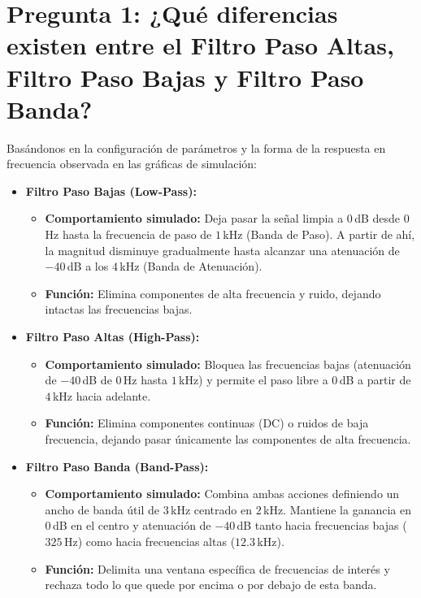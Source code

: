 \section{Pregunta 1: ¿Qué diferencias existen entre el Filtro Paso Altas, Filtro Paso Bajas y Filtro Paso Banda?}

Basándonos en la configuración de parámetros y la forma de la respuesta en frecuencia observada en las gráficas de simulación:

\begin{itemize}
	\item \textbf{Filtro Paso Bajas (Low-Pass):}
	\begin{itemize}
		\item \textbf{Comportamiento simulado:} Deja pasar la señal limpia a $0$\,dB desde $0$\,Hz hasta la frecuencia de paso de $1$\,kHz (Banda de Paso). A partir de ahí, la magnitud disminuye gradualmente hasta alcanzar una atenuación de $-40$\,dB a los $4$\,kHz (Banda de Atenuación).
		\item \textbf{Función:} Elimina componentes de alta frecuencia y ruido, dejando intactas las frecuencias bajas.
	\end{itemize}
	\item \textbf{Filtro Paso Altas (High-Pass):}
	\begin{itemize}
		\item \textbf{Comportamiento simulado:} Bloquea las frecuencias bajas (atenuación de $-40$\,dB de $0$\,Hz hasta $1$\,kHz) y permite el paso libre a $0$\,dB a partir de $4$\,kHz hacia adelante.
		\item \textbf{Función:} Elimina componentes continuas (DC) o ruidos de baja frecuencia, dejando pasar únicamente las componentes de alta frecuencia.
	\end{itemize}
	\item \textbf{Filtro Paso Banda (Band-Pass):}
	\begin{itemize}
		\item \textbf{Comportamiento simulado:} Combina ambas acciones definiendo un ancho de banda útil de $3$\,kHz centrado en $2$\,kHz. Mantiene la ganancia en $0$\,dB en el centro y atenuación de $-40$\,dB tanto hacia frecuencias bajas ($325$\,Hz) como hacia frecuencias altas ($12.3$\,kHz).
		\item \textbf{Función:} Delimita una ventana específica de frecuencias de interés y rechaza todo lo que quede por encima o por debajo de esta banda.
	\end{itemize}
\end{itemize}

